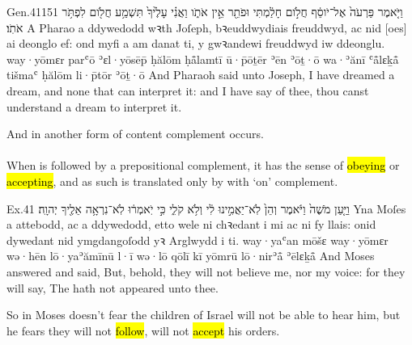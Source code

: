 \begin{example}{Gen.}{41}{15}{1}{}
	\quoling
	{וַיֹּ֤אמֶר פַּרְעֹה֙ אֶל־יֹוסֵ֔ף חֲלֹ֣ום חָלַ֔מְתִּי וּפֹתֵ֖ר אֵ֣ין אֹתֹ֑ו וַאֲנִ֗י  עָלֶ֙יךָ֙  תִּשְׁמַ֥ע חֲלֹ֖ום לִפְתֹּ֥ר אֹתֹֽו׃}
	{A Pharao a ddywedodd wꝛth Joſeph, bꝛeuddwydiais freuddwyd, ac nid [oes] ai deonglo ef: ond myfi a   am danat ti, y gwꝛandewi freuddwyd iw ddeonglu.}
	{way·yōmɛr parʿō ʾɛl·yōsēp̄ ḥălōm ḥå̄lamtī ū·p̄ōṯēr ʾēn ʾōṯ·ō wa·ʾănī  ʿå̄lɛḵå̄  tišmaʿ ḥălōm li·p̄tōr ʾōṯ·ō}
	{And Pharaoh said unto Joseph, I have dreamed a dream, and  none that can interpret it: and I have  say of thee,  thou canst understand a dream to interpret it.}
\end{example}
\begin{paper}
	\explain And in  another form of content complement occurs.
\end{paper}



\paragraph{}


\begin{paper}
	When  is followed by a prepositional complement, it has the sense of \hl{obeying} or \hl{accepting}, and as such is translated only by  with  ‘on’ complement.
\end{paper}

\begin{example}{Ex.}{4}{1}{}{}
	\quoling
	{וַיַּ֤עַן מֹשֶׁה֙ וַיֹּ֔אמֶר וְהֵן֙ לֹֽא־יַאֲמִ֣ינוּ לִ֔י וְלֹ֥א  קֹלִ֑י כִּ֣י יֹֽאמְר֔וּ לֹֽא־נִרְאָ֥ה אֵלֶ֖יךָ יְהוָֽה׃}
	{Yna Moſes a attebodd, ac a ddywedodd, etto wele ni chꝛedant i mi ac ni   fy llais: onid dywedant nid ymgdangoſodd yꝛ Arglwydd i ti.}
	{way·yaʿan mōšɛ way·yōmɛr wə·hēn lō·yaʾămīnū l·ī wə·lō  qōlī kī yōmrū lō·nirʾå̄ ʾēlɛḵå̄ {\YHWH}}
	{And Moses answered and said, But, behold, they will not believe me, nor   my voice: for they will say, The {\LORD} hath not appeared unto thee.}
\end{example}
\begin{paper}
	\explain So in  Moses doesn’t fear the children of Israel will not be able to hear him, but he fears they will not \hl{follow}, will not \hl{accept} his orders.
\end{paper}



